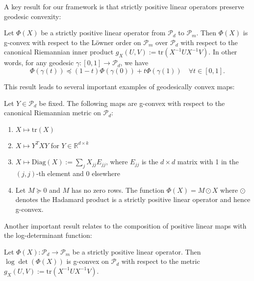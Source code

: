 A key result for our framework is that strictly positive linear operators preserve geodesic convexity:

\begin{proposition}
Let $\Phi(X)$ be a strictly positive linear operator from $\mathcal{P}_d$ to $\mathcal{P}_m$. Then $\Phi(X)$ is g-convex with respect to the Löwner order on $\mathcal{P}_m$ over $\mathcal{P}_d$ with respect to the canonical Riemannian inner product $g_X(U, V) := \text{tr}(X^{-1} U X^{-1} V)$. In other words, for any geodesic $\gamma: [0, 1] \rightarrow \mathcal{P}_d$, we have
\begin{equation}
\Phi(\gamma(t)) \preceq (1 - t)\Phi(\gamma(0)) + t\Phi(\gamma(1)) \quad \forall t \in [0, 1].
\end{equation}
\end{proposition}

This result leads to several important examples of geodesically convex maps:

\begin{example}
Let $Y \in \mathcal{P}_d$ be fixed. The following maps are g-convex with respect to the canonical Riemannian metric on $\mathcal{P}_d$:
\begin{enumerate}
\item $X \mapsto \text{tr}(X)$
\item $X \mapsto Y^T X Y$ for $Y \in \mathbb{R}^{d \times k}$
\item $X \mapsto \text{Diag}(X) := \sum_j X_{jj} E_{jj}$, where $E_{jj}$ is the $d \times d$ matrix with 1 in the $(j, j)$-th element and 0 elsewhere
\item Let $M \succeq 0$ and $M$ has no zero rows. The function $\Phi(X) = M \odot X$ where $\odot$ denotes the Hadamard product is a strictly positive linear operator and hence g-convex.
\end{enumerate}
\end{example}

Another important result relates to the composition of positive linear maps with the log-determinant function:

\begin{proposition}
Let $\Phi(X): \mathcal{P}_d \rightarrow \mathcal{P}_m$ be a strictly positive linear operator. Then $\log \det(\Phi(X))$ is g-convex on $\mathcal{P}_d$ with respect to the metric $g_X(U, V) := \text{tr}(X^{-1} U X^{-1} V)$.
\end{proposition}

